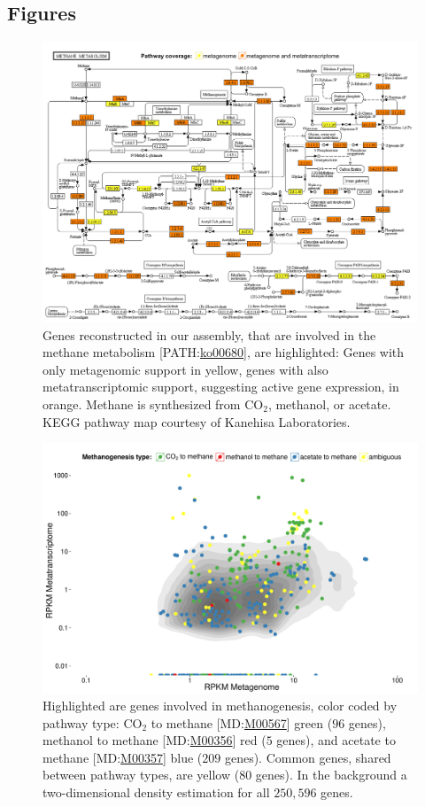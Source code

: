 \documentclass{bmcart}
\begin{document}
\begin{backmatter}
\section*{Figures}
\begin{figure}[h!]
\centering
\includegraphics[width=.9\textwidth]{Fig1.png}
\caption{
Genes reconstructed in our assembly, that are involved in the methane metabolism [PATH:\href{http://www.genome.jp/kegg-bin/show_pathway?ko00680}{ko00680}], are highlighted: Genes with only metagenomic support in yellow, genes with also metatranscriptomic support, suggesting active gene expression, in orange.
Methane is synthesized from CO$_{\text{2}}$, methanol, or acetate.
KEGG pathway map courtesy of Kanehisa Laboratories.}
\label{fPathway}
\end{figure}
\begin{figure}[h!]
\centering
\includegraphics[width=.9\textwidth]{Fig2.pdf}
\caption{
Highlighted are genes involved in methanogenesis, color coded by pathway type: CO$_{\text{2}}$ to methane [MD:\href{http://www.kegg.jp/kegg-bin/show_module?M00567}{M00567}] green ($96$ genes), methanol to methane [MD:\href{http://www.kegg.jp/kegg-bin/show_module?M00356}{M00356}] red ($5$ genes), and acetate to methane [MD:\href{http://www.kegg.jp/kegg-bin/show_module?M00357}{M00357}] blue ($209$ genes).
Common genes, shared between pathway types, are yellow ($80$ genes).
In the background a two-dimensional density estimation for all $250,596$ genes.}
\label{fCoverage}
\end{figure}


\end{backmatter}
\end{document}
